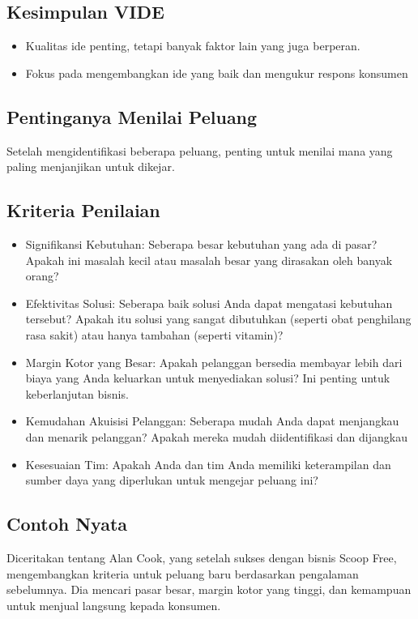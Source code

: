 \documentclass{article}
\begin{document}
\subsection{Kesimpulan VIDE}
\begin{itemize}
    \item Kualitas ide penting, tetapi banyak faktor lain yang juga berperan.
    \item Fokus pada mengembangkan ide yang baik dan mengukur respons konsumen
\end{itemize}

\subsection{Pentinganya Menilai Peluang}
Setelah mengidentifikasi beberapa peluang, penting untuk menilai mana yang paling menjanjikan untuk dikejar.

\subsection{Kriteria Penilaian}
\begin{itemize}
    \item Signifikansi Kebutuhan: Seberapa besar kebutuhan yang ada di pasar? Apakah ini masalah kecil atau masalah besar yang dirasakan oleh banyak orang?
    \item Efektivitas Solusi: Seberapa baik solusi Anda dapat mengatasi kebutuhan tersebut? Apakah itu solusi yang sangat dibutuhkan (seperti obat penghilang rasa sakit) atau hanya tambahan (seperti vitamin)?
    \item Margin Kotor yang Besar: Apakah pelanggan bersedia membayar lebih dari biaya yang Anda keluarkan untuk menyediakan solusi? Ini penting untuk keberlanjutan bisnis.
    \item Kemudahan Akuisisi Pelanggan: Seberapa mudah Anda dapat menjangkau dan menarik pelanggan? Apakah mereka mudah diidentifikasi dan dijangkau
    \item Kesesuaian Tim: Apakah Anda dan tim Anda memiliki keterampilan dan sumber daya yang diperlukan untuk mengejar peluang ini?
\end{itemize}

\subsection{Contoh Nyata}
Diceritakan tentang Alan Cook, yang setelah sukses dengan bisnis Scoop Free, mengembangkan kriteria untuk peluang baru berdasarkan pengalaman sebelumnya. Dia mencari pasar besar, margin kotor yang tinggi, dan kemampuan untuk menjual langsung kepada konsumen.
\end{document}
